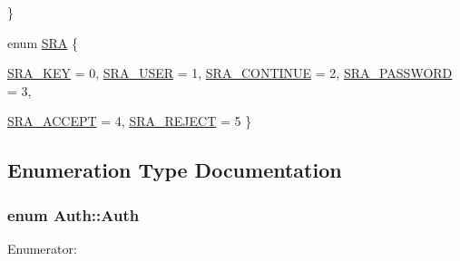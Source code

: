 \begin{DoxyCompactItemize}
 \}
\item 
enum \hyperlink{namespaceAuth_a5a80978a62d636b2d033e1574d8747b8}{SRA} \{ \par
\hyperlink{namespaceAuth_a5a80978a62d636b2d033e1574d8747b8a8cdb5cdfc8462e1333830f74e8897f47}{SRA\_\-KEY} =  0, 
\hyperlink{namespaceAuth_a5a80978a62d636b2d033e1574d8747b8abceb96a6f83400548857c5141a87708c}{SRA\_\-USER} =  1, 
\hyperlink{namespaceAuth_a5a80978a62d636b2d033e1574d8747b8a2fc156d80fffc8fd75437b618f785bea}{SRA\_\-CONTINUE} =  2, 
\hyperlink{namespaceAuth_a5a80978a62d636b2d033e1574d8747b8acad3e04c337ac945f3e9f13be071c3b7}{SRA\_\-PASSWORD} =  3, 
\par
\hyperlink{namespaceAuth_a5a80978a62d636b2d033e1574d8747b8ad980cf7e4c9d62ace40a8c1827f89e11}{SRA\_\-ACCEPT} =  4, 
\hyperlink{namespaceAuth_a5a80978a62d636b2d033e1574d8747b8a2fadce26d176114099d0dbafd1945414}{SRA\_\-REJECT} =  5
 \}
\end{DoxyCompactItemize}


\subsection{Enumeration Type Documentation}
\hypertarget{namespaceAuth_afd018dc169d551ab60f568415d4921c2}{
\subsubsection[{Auth}]{\setlength{\rightskip}{0pt plus 5cm}enum {\bf Auth::Auth}}}
\label{namespaceAuth_afd018dc169d551ab60f568415d4921c2}
\begin{Desc}
\item[Enumerator: ]\par
\begin{description}
\item[{\em 
\hypertarget{namespaceAuth_afd018dc169d551ab60f568415d4921c2aad7a8ddf26afce2091559ecae21510da}{
REPLY}
\label{namespaceAuth_afd018dc169d551ab60f568415d4921c2aad7a8ddf26afce2091559ecae21510da}
}]\item[{\em 
\hypertarget{namespaceAuth_afd018dc169d551ab60f568415d4921c2a3b1ba61eee071c160239eeabad27454e}{
NAME}
\label{namespaceAuth_afd018dc169d551ab60f568415d4921c2a3b1ba61eee071c160239eeabad27454e}
}]\end{description}
\end{Desc}



